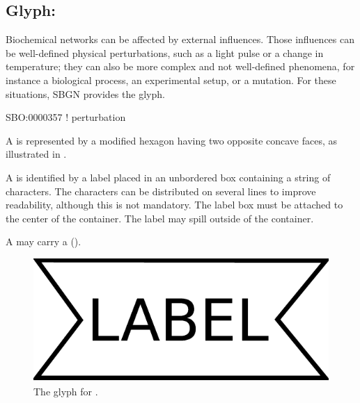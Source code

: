 
\color{red}

\subsection{Glyph: }
\label{sec:perturbation}
 
Biochemical networks can be affected by external influences.  Those
influences can be well-defined physical perturbations, such as a light
pulse or a change in temperature; they can also be more complex and not
well-defined phenomena, for instance a biological process, an experimental
setup, or a mutation.  For these situations, SBGN provides the
 glyph.

\begin{glyphDescription}

\glyphSboTerm SBO:0000357 ! perturbation

\glyphContainer A  is represented by a modified hexagon
having two opposite concave faces, as illustrated in .

\glyphLabel A  is identified by a label placed in an
unbordered box containing a string of characters.  The characters can be
distributed on several lines to improve readability, although this is not
mandatory.  The label box must be attached to the center of the
 container.  The label may spill outside of the container.

\glyphAux A  may carry a 
().

\end{glyphDescription}

\begin{figure}[H]
  \centering
  \includegraphics[scale = 0.3]{images/perturbation}
  \caption{The \ER glyph for .}
  \label{fig:perturbation}
\end{figure}

\normalcolor


